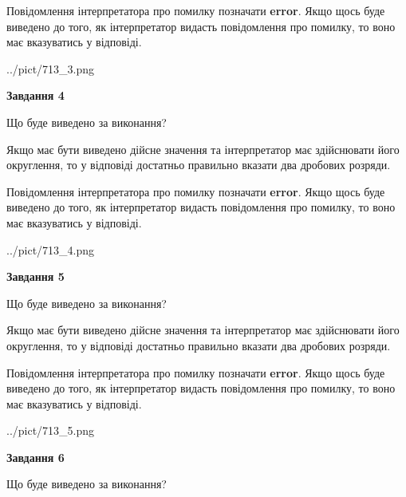 \documentclass[12pt, ukrainian]{article}
\begin{document}
{\begin {Large}
Повідомлення інтерпретатора про помилку позначати \textbf{error}.
Якщо щось буде виведено до того, як інтерпретатор видасть повідомлення про помилку, 
то воно має вказуватись у відповіді. \par

\begin{center}
	{../pict/713_3.png}
\end{center}
\newpage

{\begin {center}\textbf{Завдання 4}\end {center}}\par
Що буде виведено за виконання? \par

Якщо має бути виведено дійсне значення та інтерпретатор має здійснювати його округлення, 
то у відповіді достатньо правильно вказати два дробових розряди.

Повідомлення інтерпретатора про помилку позначати \textbf{error}.
Якщо щось буде виведено до того, як інтерпретатор видасть повідомлення про помилку, 
то воно має вказуватись у відповіді. \par

\begin{center}
	{../pict/713_4.png}
\end{center}
\newpage

{\begin {center}\textbf{Завдання 5}\end {center}}\par
Що буде виведено за виконання? \par

Якщо має бути виведено дійсне значення та інтерпретатор має здійснювати його округлення, 
то у відповіді достатньо правильно вказати два дробових розряди.

Повідомлення інтерпретатора про помилку позначати \textbf{error}.
Якщо щось буде виведено до того, як інтерпретатор видасть повідомлення про помилку, 
то воно має вказуватись у відповіді. \par

\begin{center}
	{../pict/713_5.png}
\end{center}
\newpage

{\begin {center}\textbf{Завдання 6}\end {center}}\par
Що буде виведено за виконання? \par


\end{Large}}
\end{document}
